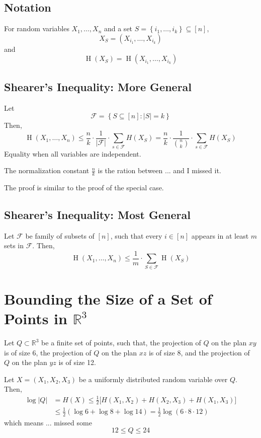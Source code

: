 \documentclass{article}
\begin{document}
\subsection{Notation}
For random variables $X_1,\ldots, X_n$ and a set $S=\left\{i_1,\ldots,i_k\right\}\subseteq [n]$,
\[
X_S = \left(X_{i_1},\ldots, X_{i_k}\right)
\]
and 
\[
\operatorname{H}(X_S) = \operatorname{H}\left(X_{i_1},\ldots, X_{i_k}\right)
\]

\subsection{Shearer's Inequality: More General}
Let 
\[
\mathcal{F}=\left\{S\subseteq [n]: \lvert S \rvert = k\right\}
\]
Then,
\[
\operatorname{H}\left(X_1,\ldots, X_n\right)\leq \frac{n}{k}\cdot \frac{1}{\lvert \mathcal{F} \rvert}\cdot \sum_{s\in\mathcal{F}}H(X_S)=\frac{n }{k }\cdot \frac{1 }{\binom{n }{k }}\cdot \sum_{s\in\mathcal{F}}H(X_S)
\]
Equality when all variables are independent.

The normalization constant $\frac{n }{k }  $ is the ration between ... and I missed it.

The proof is similar to the proof of the special case.

\subsection{Shearer's Inequality: Most General}
Let $\mathcal{F}$ be family of subsets of $[n]$, such that every $i\in [n]$ appears in at least $m$ sets in $\mathcal{F}$. Then,
\[
\operatorname{H}\left(X_1,\ldots, X_n\right)\leq \frac{1}{m}\cdot \sum_{S\in\mathcal{F}}\operatorname{H}\left(X_S\right)
\]

\section{Bounding the Size of a Set of Points in $\mathbb{R}^3$}

Let $Q\subset \mathbb{R}^3$ be a finite set of points, such that, the projection of $Q$ on the plan $xy$ is of size $6$, the projection of $Q$ on the plan $xz$ is of size 8, and the projection of $Q$ on the plan $yz$ is of size 12.

Let $X=\left(X_1, X_2, X_3\right)$ be a uniformly distributed random variable over $Q$. Then,
\[
\]
\begin{align*}
    \log \lvert Q\rvert &= H(X) \leq \frac{1}{2}\big[H(X_1,X_2) + H(X_2,X_3) + H(X_1,X_3)\big]\\
    &\leq \frac{1}{2}\left(\log 6 + \log 8 + \log 14\right)=\frac{1}{2}\log \left(6\cdot 8\cdot 12\right)
\end{align*}
which means ... missed some
\[
12\leq Q\leq 24
\]
\end{document}
